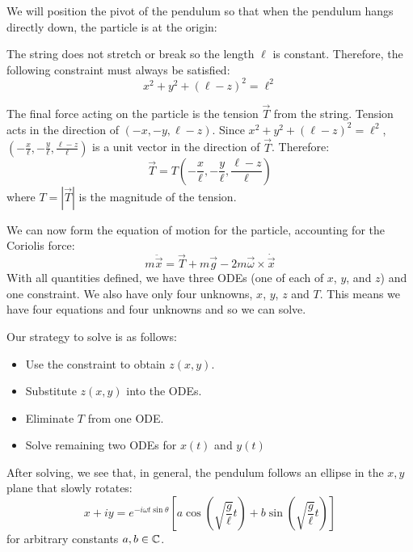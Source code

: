 \documentclass[../main.tex]{subfiles}
\begin{document}
We will position the pivot of the pendulum so that when the pendulum hangs directly down, the particle is at the origin:
\begin{center}
\end{center}
The string does not stretch or break so the length $\ell$ is constant.
Therefore, the following constraint must always be satisfied:
\[
  x^2 + y^2 + (\ell - z)^2 = \ell^2
\]

The final force acting on the particle is the tension $\vec{T}$ from the string.
Tension acts in the direction of $(-x, -y, \ell - z)$.
Since $x^2 + y^2 + (\ell - z)^2 = \ell^2$, $\left(-\frac{x}{\ell}, -\frac{y}{\ell}, \frac{\ell - z}{\ell}\right)$ is a unit vector in the direction of $\vec{T}$.
Therefore:
\[
  \vec{T} = T\left(-\frac{x}{\ell}, -\frac{y}{\ell}, \frac{\ell - z}{\ell}\right)
\]
where $T = |\vec{T}|$ is the magnitude of the tension.

We can now form the equation of motion for the particle, accounting for the Coriolis force:
\[
  m \ddot{\vec{x}} = \vec{T} + m \vec{g} - 2m \vec{\omega} \times \dot{\vec{x}}
\]
With all quantities defined, we have three ODEs (one of each of $x$, $y$, and $z$) and one constraint.
We also have only four unknowns, $x$, $y$, $z$ and $T$.
This means we have four equations and four unknowns and so we can solve.

Our strategy to solve is as follows:
\begin{itemize}
  \item Use the constraint to obtain $z(x, y)$.
  \item Substitute $z(x, y)$ into the ODEs.
  \item Eliminate $T$ from one ODE.
  \item Solve remaining two ODEs for $x(t)$ and $y(t)$
\end{itemize}
After solving, we see that, in general, the pendulum follows an ellipse in the $x, y$ plane that slowly rotates:
\[
  x + iy = e^{-i \omega t \sin \theta} \left[a \cos \left(\sqrt{\frac{g}{\ell}}t\right) + b \sin \left(\sqrt{\frac{g}{\ell}}t\right)\right]
\]
for arbitrary constants $a, b \in \mathbb{C}$.
\end{document}
